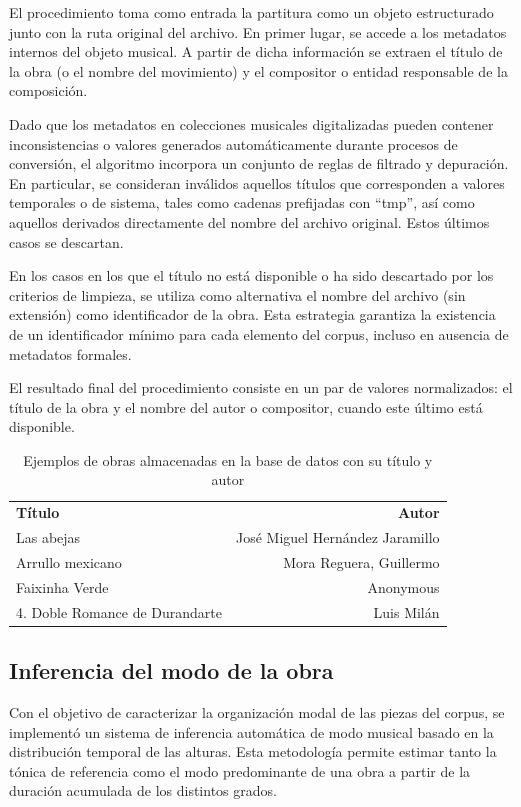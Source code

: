 El procedimiento toma como entrada la partitura como un objeto estructurado junto con la ruta original del archivo. En primer lugar, se accede a los metadatos internos del objeto musical. A partir de dicha información se extraen el título de la obra (o el nombre del movimiento) y el compositor o entidad responsable de la composición.

Dado que los metadatos en colecciones musicales digitalizadas pueden contener inconsistencias o valores generados automáticamente durante procesos de conversión, el algoritmo incorpora un conjunto de reglas de filtrado y depuración. En particular, se consideran inválidos aquellos títulos que corresponden a valores temporales o de sistema, tales como cadenas prefijadas con “tmp”, así como aquellos derivados directamente del nombre del archivo original. Estos últimos casos se descartan.

En los casos en los que el título no está disponible o ha sido descartado por los criterios de limpieza, se utiliza como alternativa el nombre del archivo (sin extensión) como identificador de la obra. Esta estrategia garantiza la existencia de un identificador mínimo para cada elemento del corpus, incluso en ausencia de metadatos formales.

El resultado final del procedimiento consiste en un par de valores normalizados: el título de la obra y el nombre del autor o compositor, cuando este último está disponible.

\begin{table}[H]
\centering
\begin{tabular}{lr}
\textbf{Título} & \textbf{Autor} \\
Las abejas & José Miguel Hernández Jaramillo \\
Arrullo mexicano & Mora Reguera, Guillermo \\
Faixinha Verde & Anonymous \\
4. Doble Romance de Durandarte & Luis Milán \\
\end{tabular}
\caption{Ejemplos de obras almacenadas en la base de datos con su título y autor}
\end{table}

\subsection{Inferencia del modo de la obra}
Con el objetivo de caracterizar la organización modal de las piezas del corpus, se implementó un sistema de inferencia automática de modo musical basado en la distribución temporal de las alturas. Esta metodología permite estimar tanto la tónica de referencia como el modo predominante de una obra a partir de la duración acumulada de los distintos grados.

